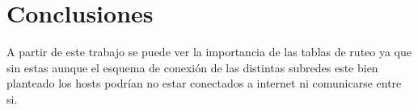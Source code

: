 \section{Conclusiones}
    A partir de este trabajo se puede ver la importancia de las tablas de ruteo ya que sin estas aunque el esquema de conexión de las distintas subredes este bien planteado los hosts podrían no estar conectados a internet ni comunicarse entre si.